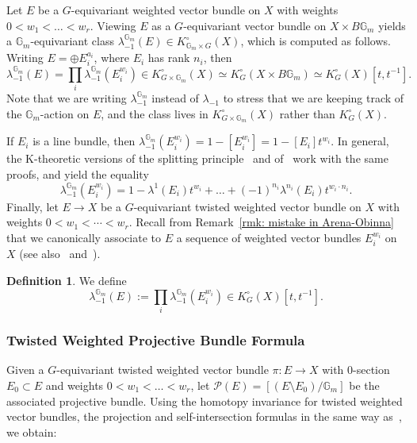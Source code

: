 \documentclass[12pt]{amsart}
\newcommand\Gm{\mathbb{G}_m}
\newcommand{\cP}{\mathcal{P}}
\newcommand{\Kring}{K^{\circ}}
\theoremstyle{definition}
\newtheorem{Def}[theorem]{Definition}
\begin{document}
Let $E$ be a $G$-equivariant weighted vector bundle on $X$ with weights $0<w_1<\ldots<w_r$. Viewing $E$ as a $G$-equivariant vector bundle on $X\times B\Gm$ yields a $\Gm$-equivariant class $\lambda_{-1}^{\Gm}(E) \in \Kring_{\Gm \times G}(X)$, which is computed as follows. Writing $E=\oplus E_i^{a_i}$, where $E_i$ has rank $n_i$, then
\[
    \lambda_{-1}^{\Gm}(E)=\prod_i\lambda_{-1}^{\Gm}(E_i^{w_i})\in\Kring_{G\times\Gm}(X) \simeq \Kring_{G}(X \times B\Gm) \simeq \Kring_G(X)[t,t^{-1}].
\]
Note that we are writing $\lambda_{-1}^{\Gm}$ instead of $\lambda_{-1}$ to stress that we are keeping track of the $\Gm$-action on $E$, and the class lives in $\Kring_{G\times\Gm}(X)$ rather than $\Kring_{G}(X)$.

If $E_i$ is a line bundle, then $\lambda_{-1}^{\Gm}(E_i^{w_i})=1-[E_i^{w_i}]=1-[E_i]t^{w_i}$.
In general, the K-theoretic versions of the splitting principle~\cite[page 51]{fulton} and of~\cite[Proposition 3.6, Corollary 3.7]{Arena-Obinna} work with the same proofs, and yield the equality
\[
    \lambda_{-1}^{\Gm}(E_i^{w_i})=1-\lambda^1(E_i)t^{w_i}+\ldots+(-1)^{n_i}\lambda^{n_i}(E_i)t^{w_i\cdot n_i}.
\]
Finally, let $E \to X$ be a $G$-equivariant twisted weighted vector bundle on $X$ with weights $0<w_1<\cdots<w_r$. Recall from Remark~\ref{rmk: mistake in Arena-Obinna} that we canonically associate to $E$ a sequence of weighted vector bundles $E_i^{w_i}$ on $X$ (see also~\cite[Section 2.1.9]{quek-rydh-weighted-blowup} and~\cite[Proposition~3.8]{Arena-Obinna}).

\begin{Def}\label{def: euler class twisted weighted vector bundle}
    We define
    \[
        \lambda_{-1}^{\Gm}(E):=\prod_i\lambda_{-1}^{\Gm}(E_i^{w_i})\in\Kring_G(X)[t,t^{-1}].
    \]
\end{Def}

\subsubsection{Twisted Weighted Projective Bundle Formula}\label{subsec: projective bundle formula}

Given a $G$-equivariant twisted weighted vector bundle $\pi:E\rightarrow X$ with 0-section $E_0\subset E$ and weights $0<w_1<\ldots<w_r$, let $\cP(E)=[(E\setminus E_0)/\Gm]$ be the associated projective bundle. Using the homotopy invariance for twisted weighted vector bundles, the projection and self-intersection formulas in the same way as~\cite[Lemma 2.5, Corollary 3.11]{Arena-Obinna}, we obtain:
\end{document}
